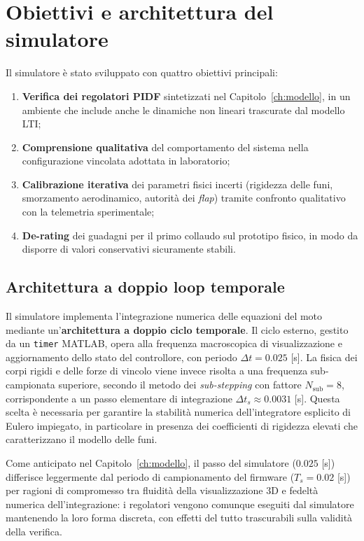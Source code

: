 \documentclass[11pt]{report}
\begin{document}
	\section{Obiettivi e architettura del simulatore}
	\label{sec:architettura_sim}
	
	Il simulatore è stato sviluppato con quattro obiettivi principali:
	\begin{enumerate}
		\item \textbf{Verifica dei regolatori PIDF} sintetizzati nel Capitolo~\ref{ch:modello}, in un ambiente che include anche le dinamiche non lineari trascurate dal modello LTI;
		\item \textbf{Comprensione qualitativa} del comportamento del sistema nella configurazione vincolata adottata in laboratorio;
		\item \textbf{Calibrazione iterativa} dei parametri fisici incerti (rigidezza delle funi, smorzamento aerodinamico, autorità dei \textit{flap}) tramite confronto qualitativo con la telemetria sperimentale;
		\item \textbf{De-rating} dei guadagni per il primo collaudo sul prototipo fisico, in modo da disporre di valori conservativi sicuramente stabili.
	\end{enumerate}
	
	\subsection{Architettura a doppio loop temporale}
	Il simulatore implementa l'integrazione numerica delle equazioni del moto mediante un'\textbf{architettura a doppio ciclo temporale}. Il ciclo esterno, gestito da un \texttt{timer} MATLAB, opera alla frequenza macroscopica di visualizzazione e aggiornamento dello stato del controllore, con periodo $\Delta t = 0.025$ [s]. La fisica dei corpi rigidi e delle forze di vincolo viene invece risolta a una frequenza sub-campionata superiore, secondo il metodo dei \textit{sub-stepping} con fattore $N_\text{sub} = 8$, corrispondente a un passo elementare di integrazione $\Delta t_s \approx 0.0031$ [s]. Questa scelta è necessaria per garantire la stabilità numerica dell'integratore esplicito di Eulero impiegato, in particolare in presenza dei coefficienti di rigidezza elevati che caratterizzano il modello delle funi.
	
	Come anticipato nel Capitolo~\ref{ch:modello}, il passo del simulatore ($0.025$ [s]) differisce leggermente dal periodo di campionamento del firmware ($T_s = 0.02$ [s]) per ragioni di compromesso tra fluidità della visualizzazione 3D e fedeltà numerica dell'integrazione: i regolatori vengono comunque eseguiti dal simulatore mantenendo la loro forma discreta, con effetti del tutto trascurabili sulla validità della verifica.
	
\end{document}
